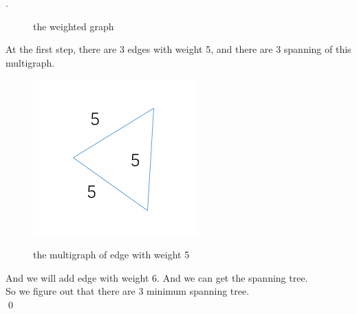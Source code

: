 \documentclass[12pt, notitlepage]{article}
\newenvironment{sol}
  {\par\vspace{3mm}\noindent{\it Solution}.}{\qed}
\begin{document}
\begin{sol}
\begin{figure}[H]
	\caption{the weighted graph} \nonumber\label{fig:the weighted graph}\vspace{-10pt}
\end{figure}
At the first step, there are 3 edges with weight 5, and there are 3 spanning of this multigraph.\\
\begin{figure}[H]
	\center
	\includegraphics[width=0.4\linewidth]{11-2.png}\vspace{-10pt}
	\caption{the multigraph of edge with weight 5} \nonumber\label{fig:the weighted graph2}\vspace{-10pt}
\end{figure}
And we will add edge with weight 6. And we can get the spanning tree.\\
So we figure out that there are 3 minimum spanning tree.\\

\end{sol}
\end{document}
